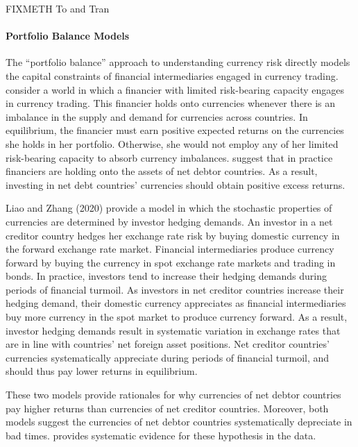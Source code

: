 \documentclass{ar-1col}
\begin{document}
FIXMETH To and Tran


\paragraph*{Portfolio Balance Models} The  ``portfolio balance'' approach to understanding currency risk directly models the capital constraints of financial intermediaries engaged in currency trading. \citet{GabaixMaggiori2015} consider a world in which a financier with limited risk-bearing capacity engages in currency trading. This financier holds onto currencies whenever there is an imbalance in the supply and demand for currencies across countries. In equilibrium, the financier must earn positive expected returns on the currencies she holds in her portfolio. Otherwise, she would not employ any of her limited risk-bearing capacity to absorb currency imbalances. \citet{GabaixMaggiori2015} suggest that in practice financiers are holding onto the assets of net debtor countries. As a result, investing in net debt countries' currencies should obtain positive excess returns. 

Liao and Zhang (2020) provide a model in which the stochastic properties of currencies are determined by investor hedging demands. An investor in a net creditor country hedges her exchange rate risk by buying domestic currency in the forward exchange rate market. Financial intermediaries produce currency forward by buying the currency in spot exchange rate markets and trading in bonds. In practice, investors tend to increase their hedging demands during periods of financial turmoil. As investors in net creditor countries increase their hedging demand, their domestic currency appreciates as financial intermediaries buy more currency in the spot market to produce currency forward. As a result, investor hedging demands result in systematic variation in exchange rates that are in line with countries' net foreign asset positions. Net creditor countries' currencies systematically appreciate during periods of financial turmoil, and should thus pay lower returns in equilibrium.

These two models provide rationales for why currencies of net debtor countries pay higher returns than currencies of net creditor countries. Moreover, both models suggest the currencies of net debtor countries systematically depreciate in bad times. \citet{DellaCorteetal2009} provides systematic evidence for these hypothesis in the data. 
 
\end{document}
